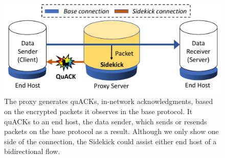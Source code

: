 \begin{figure}[t]
	\centering
	\includegraphics[width=\linewidth]{sidekick-paper/figures/sc_protocol.pdf}
\caption{The proxy generates quACKs, in-network acknowledgments, based on
the encrypted packets it observes in the base protocol. It quACKs to an end
host, the data sender, which sends or resends packets on the base protocol as a result.
Although we only show one side of the connection, the Sidekick could assist
either end host of a bidirectional flow.
}
\label{fig:sc-protocols}
\end{figure}
